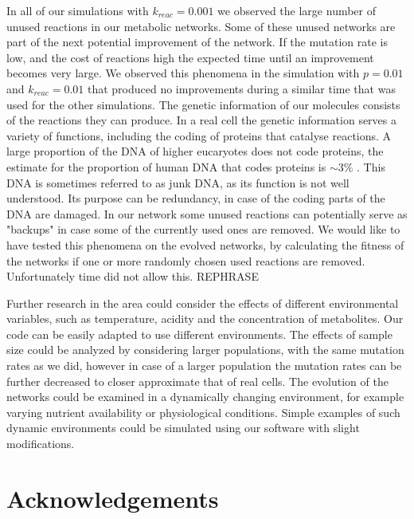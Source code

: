\documentclass[a4paper,12pt]{article}
\begin{document}
	In all of our simulations with $k_{reac}=0.001$ we observed the large number of unused reactions in our metabolic networks. Some of these unused networks are part of the next potential improvement of the network. If the mutation rate is low, and the cost of reactions high the expected time until an improvement becomes very large. We observed this phenomena in the simulation with $p=0.01$ and $k_{reac}=0.01$ that produced no improvements during a similar time that was used for the other simulations. The genetic information of our molecules consists of the reactions they can produce. In a real cell the genetic information serves a variety of functions, including the coding of proteins that catalyse reactions. A large proportion of the DNA of higher eucaryotes does not code proteins, the estimate for the proportion of human DNA that codes proteins is $\sim 3\%$ \cite{junkdna}. This DNA is sometimes referred to as junk DNA, as its function is not well understood. Its purpose can be redundancy, in case of the coding parts of the DNA are damaged. In our network some unused reactions can potentially serve as "backups" in case some of the currently used ones are removed. We would like to have tested this phenomena on the evolved networks, by calculating the fitness of the networks if one or more randomly chosen used reactions are removed. Unfortunately time did not allow this.  REPHRASE
	
	
	
	Further research in the area could consider the effects of different environmental variables, such as temperature, acidity and the concentration of metabolites. Our code can be easily adapted to use different environments. The effects of sample size could be analyzed by considering larger populations, with the same mutation rates as we did, however in case of a larger population the mutation rates can be further decreased to closer approximate that of real cells. The evolution of the networks could be examined in a dynamically changing environment, for example varying nutrient availability or physiological conditions. Simple examples of such dynamic environments could be simulated using our software with slight modifications. 
	
	
	\section*{Acknowledgements}
	
\end{document}
